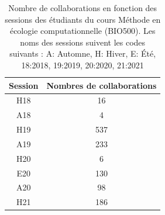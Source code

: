 \documentclass[12pt]{article}
\begin{document}
\begin{table}
    \centering
    \begin{tabular}{c|c}
    Session & Nombres de collaborations \\
    \hline
    H18 & 16 \\
    A18 & 4 \\
    H19 & 537 \\
    A19 & 233 \\
    H20 & 6 \\
    E20 & 130 \\
    A20 & 98 \\
    H21 & 186
    \end{tabular}
    \caption{Nombre de collaborations en fonction des sessions des étudiants du cours Méthode en écologie computationnelle (BIO500). Les noms des sessions suivent les codes suivants : A: Automne, H: Hiver, E: Été, 18:2018, 19:2019, 20:2020, 21:2021}
    \label{tableau}
\end{table}
\end{document}
